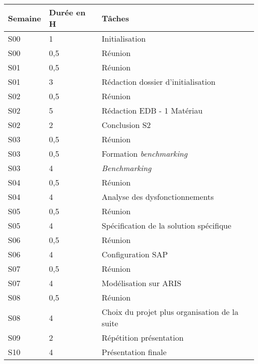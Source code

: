 \documentclass[twoside]{article}
\begin{document}
\begin{longtable}{|l|l|l|}
\hline
Semaine&Durée en H&Tâches\\
\hline
S00&1&Initialisation\\
\hline
S00&0,5&Réunion\\
\hline
S01&0,5&Réunion\\
\hline
S01&3&Rédaction dossier d'initialisation\\
\hline
S02&0,5&Réunion\\
\hline
S02&5&Rédaction EDB - 1 Matériau\\
\hline
S02&2&Conclusion S2\\
\hline
S03&0,5&Réunion\\
\hline
S03&0,5&Formation \textsl{benchmarking}\\
\hline
S03&4&\textsl{Benchmarking}\\
\hline
S04&0,5&Réunion\\
\hline
S04&4&Analyse des dysfonctionnements\\
\hline
S05&0,5&Réunion\\
\hline
S05&4&Spécification de la solution spécifique\\
\hline
S06&0,5&Réunion\\
\hline
S06&4&Configuration SAP\\
\hline
S07&0,5&Réunion\\
\hline
S07&4&Modélisation sur ARIS\\
\hline
S08&0,5&Réunion\\
\hline
S08&4&Choix du projet plus organisation de la suite\\
\hline
S09&2&Répétition présentation\\
\hline
S10&4&Présentation finale\\
\hline
\end{longtable}


\pagebreak
\end{document}
